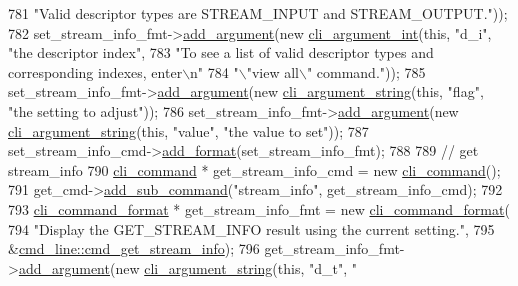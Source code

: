 \begin{DoxyCode}
781                                                               \textcolor{stringliteral}{"Valid descriptor types are STREAM\_INPUT and
       STREAM\_OUTPUT."}));
782     set\_stream\_info\_fmt->\hyperlink{classcli__command__format_ac3fc6d13a227c195d5ee6f7b78eba9cd}{add\_argument}(\textcolor{keyword}{new} \hyperlink{classcli__argument__int}{cli\_argument\_int}(\textcolor{keyword}{this}, \textcolor{stringliteral}{"d\_i"}, \textcolor{stringliteral}{"the
       descriptor index"},
783                                                            \textcolor{stringliteral}{"To see a list of valid descriptor types and
       corresponding indexes, enter\(\backslash\)n"}
784                                                            \textcolor{stringliteral}{"\(\backslash\)"view all\(\backslash\)" command."}));
785     set\_stream\_info\_fmt->\hyperlink{classcli__command__format_ac3fc6d13a227c195d5ee6f7b78eba9cd}{add\_argument}(\textcolor{keyword}{new} \hyperlink{classcli__argument__string}{cli\_argument\_string}(\textcolor{keyword}{this}, \textcolor{stringliteral}{"flag"}, \textcolor{stringliteral}{
      "the setting to adjust"}));
786     set\_stream\_info\_fmt->\hyperlink{classcli__command__format_ac3fc6d13a227c195d5ee6f7b78eba9cd}{add\_argument}(\textcolor{keyword}{new} \hyperlink{classcli__argument__string}{cli\_argument\_string}(\textcolor{keyword}{this}, \textcolor{stringliteral}{"value"},
       \textcolor{stringliteral}{"the value to set"}));
787     set\_stream\_info\_cmd->\hyperlink{classcli__command_aa9ec38e761644d946f8db2b920e39921}{add\_format}(set\_stream\_info\_fmt);
788 
789     \textcolor{comment}{// get stream\_info}
790     \hyperlink{classcli__command}{cli\_command} * get\_stream\_info\_cmd = \textcolor{keyword}{new} \hyperlink{classcli__command}{cli\_command}();
791     get\_cmd->\hyperlink{classcli__command_aa73a67e8ebb6facd4b40ced66279b226}{add\_sub\_command}(\textcolor{stringliteral}{"stream\_info"}, get\_stream\_info\_cmd);
792 
793     \hyperlink{classcli__command__format}{cli\_command\_format} * get\_stream\_info\_fmt = \textcolor{keyword}{new} 
      \hyperlink{classcli__command__format}{cli\_command\_format}(
794         \textcolor{stringliteral}{"Display the GET\_STREAM\_INFO result using the current setting."},
795         &\hyperlink{classcmd__line_ae6972fce5d12e11d46134a3887f91948}{cmd\_line::cmd\_get\_stream\_info});
796     get\_stream\_info\_fmt->\hyperlink{classcli__command__format_ac3fc6d13a227c195d5ee6f7b78eba9cd}{add\_argument}(\textcolor{keyword}{new} \hyperlink{classcli__argument__string}{cli\_argument\_string}(\textcolor{keyword}{this}, \textcolor{stringliteral}{"d\_t"}, \textcolor{stringliteral}{"
}
\end{DoxyCode}
